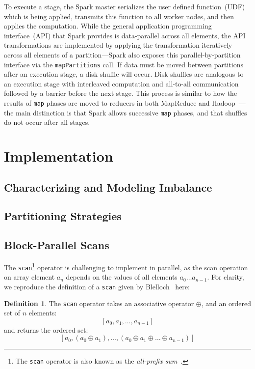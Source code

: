 \documentclass[preprint]{sigplanconf}
\theoremstyle{definition}
\newtheorem{defn}{Definition}
\begin{document}
To execute a stage, the Spark master serializes the user defined function~(UDF) which is being applied,
transmits this function to all worker nodes, and then applies the computation. While the general
application programming interface~(API) that Spark provides is data-parallel across all elements,
the API transformations are implemented by applying the transformation iteratively across all elements
of a partition---Spark also exposes this parallel-by-partition interface via the \texttt{mapPartitions} call.
If data must be moved between partitions after an execution stage, a disk shuffle will occur. Disk
shuffles are analogous to an execution stage with interleaved computation and all-to-all communication
followed by a barrier before the next stage. This process is similar to how the results of \texttt{map}
phases are moved to reducers in both MapReduce and Hadoop~\cite{dean04}---the main distinction is
that Spark allows successive \texttt{map} phases, and that shuffles do not occur after all stages.

\section{Implementation}
\label{sec:implementation}

\subsection{Characterizing and Modeling Imbalance}
\label{sec:imbalance}

\subsection{Partitioning Strategies}
\label{sec:partitioning-strategies}

\subsection{Block-Parallel Scans}
\label{sec:block-parallel-scans}

The \texttt{scan}\footnote{The \texttt{scan} operator is also known as the \emph{all-prefix
sum}~\cite{blelloch93}.} operator is challenging to implement in parallel, as the scan operation on array
element $a_n$ depends on the values of all elements $a_0 \ldots a_{n - 1}$. For clarity, we
reproduce the definition of a \texttt{scan} given by Blelloch~\cite{blelloch93} here:

\begin{defn}
\label{defn:scan}
The \texttt{scan} operator takes an associative operator $\oplus$, and an ordered set of $n$ elements:
$$
[a_0, a_1, \ldots, a_{n - 1}]
$$
and returns the ordered set:
$$
[a_0, (a_0 \oplus a_1), \ldots, (a_0 \oplus a_1 \oplus \ldots \oplus a_{n - 1})]
$$
\end{defn}
\end{document}
